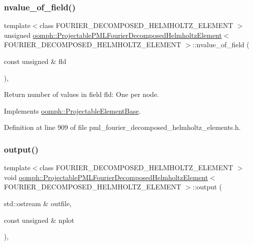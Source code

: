 \subsubsection{\texorpdfstring{nvalue\+\_\+of\+\_\+field()}{nvalue\_of\_field()}}
{\footnotesize\ttfamily template$<$class F\+O\+U\+R\+I\+E\+R\+\_\+\+D\+E\+C\+O\+M\+P\+O\+S\+E\+D\+\_\+\+H\+E\+L\+M\+H\+O\+L\+T\+Z\+\_\+\+E\+L\+E\+M\+E\+NT $>$ \\
unsigned \hyperlink{classoomph_1_1ProjectablePMLFourierDecomposedHelmholtzElement}{oomph\+::\+Projectable\+P\+M\+L\+Fourier\+Decomposed\+Helmholtz\+Element}$<$ F\+O\+U\+R\+I\+E\+R\+\_\+\+D\+E\+C\+O\+M\+P\+O\+S\+E\+D\+\_\+\+H\+E\+L\+M\+H\+O\+L\+T\+Z\+\_\+\+E\+L\+E\+M\+E\+NT $>$\+::nvalue\+\_\+of\+\_\+field (\begin{DoxyParamCaption}\item[{const unsigned \&}]{fld }\end{DoxyParamCaption})\hspace{0.3cm}{\ttfamily [inline]}, {\ttfamily [virtual]}}



Return number of values in field fld\+: One per node. 



Implements \hyperlink{classoomph_1_1ProjectableElementBase_a1a9a6de16f3511bca8e8be770abb9c2e}{oomph\+::\+Projectable\+Element\+Base}.



Definition at line 909 of file pml\+\_\+fourier\+\_\+decomposed\+\_\+helmholtz\+\_\+elements.\+h.

\mbox{\label{classoomph_1_1ProjectablePMLFourierDecomposedHelmholtzElement_abd1a586c0951d26cb145288ed5884ecb}} 
\subsubsection{\texorpdfstring{output()}{output()}}
{\footnotesize\ttfamily template$<$class F\+O\+U\+R\+I\+E\+R\+\_\+\+D\+E\+C\+O\+M\+P\+O\+S\+E\+D\+\_\+\+H\+E\+L\+M\+H\+O\+L\+T\+Z\+\_\+\+E\+L\+E\+M\+E\+NT $>$ \\
void \hyperlink{classoomph_1_1ProjectablePMLFourierDecomposedHelmholtzElement}{oomph\+::\+Projectable\+P\+M\+L\+Fourier\+Decomposed\+Helmholtz\+Element}$<$ F\+O\+U\+R\+I\+E\+R\+\_\+\+D\+E\+C\+O\+M\+P\+O\+S\+E\+D\+\_\+\+H\+E\+L\+M\+H\+O\+L\+T\+Z\+\_\+\+E\+L\+E\+M\+E\+NT $>$\+::output (\begin{DoxyParamCaption}\item[{std\+::ostream \&}]{outfile,  }\item[{const unsigned \&}]{nplot }\end{DoxyParamCaption})\hspace{0.3cm}{\ttfamily [inline]}, {\ttfamily [virtual]}}



